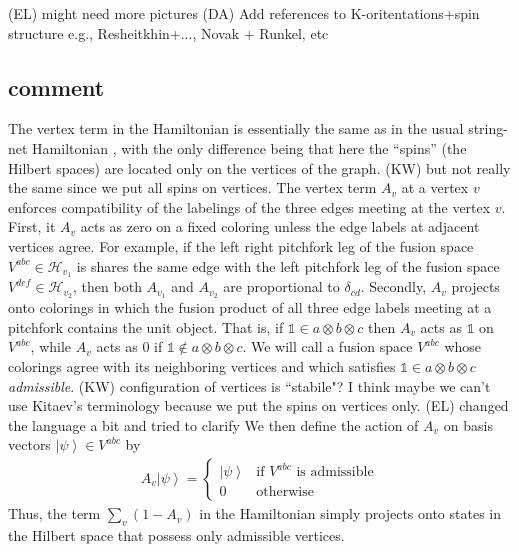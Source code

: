 \documentclass[12pt,a4paper]{article}
\newcommand{\tp}{\otimes}
\newcommand{\unit}{\mathds{1}}
\newcommand{\mch}{\mathcal{H}}
\newcommand{\kw}[1]{{\color{kwcolor}\footnotesize{(KW) #1}}}
\newcommand{\ket}[1]{\ensuremath{\left|#1\right\rangle}}
\newcommand{\dave}[1]{{\color{ao(english)}\footnotesize{(DA) #1}}}
\newcommand{\ethan}[1]{{\color{amethyst}\footnotesize{(EL) #1}}}
\begin{document}
\ethan{might need more pictures}
\dave{Add references to K-oritentations+spin structure e.g., Resheitkhin+..., Novak + Runkel, etc}
 
 



 
\subsection{comment}
The vertex term in the Hamiltonian is essentially the same as in the usual string-net Hamiltonian \cite{Kitaev2012}, with the only difference being that here the ``spins'' (the Hilbert spaces) are located only on the vertices of the graph.
\kw{but not really the same since we put all spins on vertices.}
The vertex term $A_v$ at a vertex $v$ enforces compatibility of the labelings of the three edges meeting at the vertex $v$. 
First, it $A_v$ acts as zero on a fixed coloring unless the edge labels at adjacent vertices agree.
For example, if the left right pitchfork leg of the fusion space $V^{abc} \in \mch_{v_1}$ is shares the same edge with the left pitchfork leg of the fusion space $V^{def} \in \mch_{v_2}$, then both $A_{v_1}$ and $A_{v_2}$ are proportional to $\delta_{cd}$.
Secondly, $A_v$ projects onto colorings in which the fusion product of all three edge labels meeting at a pitchfork contains the unit object. 
That is, if $\unit \in a\tp b \tp c$ then $A_v$ acts as $\unit$ on $V^{abc}$, while $A_v$ acts as $0$ if $\unit \notin a\tp b \tp c$.
We will call a fusion space $V^{abc}$ whose colorings agree with its neighboring vertices and which satisfies $\unit \in a \tp b \tp c$ {\it admissible}. 
\kw{configuration of vertices is ``stabile"?  I think maybe we can't use Kitaev's terminology because we put the spins on vertices only.} \ethan{changed the language a bit and tried to clarify}
We then define the action of $A_v$ on basis vectors $\ket{\psi} \in V^{abc}$ by
\begin{align}
A_v \ket{\psi} = 
\left\{
                \begin{array}{ll}
                   \ket{\psi} & \text{if $V^{abc}$ is admissible} \\
                  0 & \text{otherwise}
                \end{array}
              \right.
\end{align}
Thus, the term $\sum_v (1-A_v)$ in the Hamiltonian simply projects onto states in the Hilbert space that possess only admissible vertices. 
\end{document}
